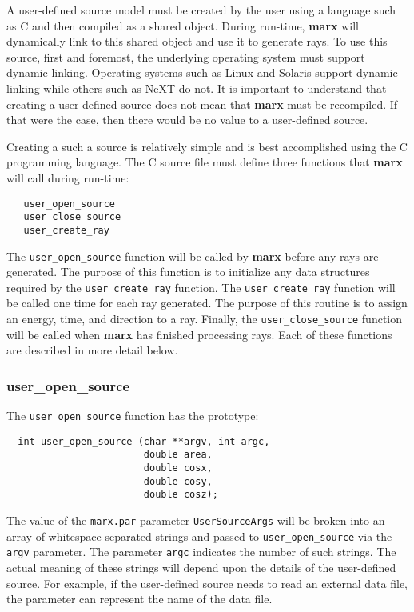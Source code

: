 \documentclass{article}
\newcommand{\marx}{{\bf marx}}
\begin{document}
 A user-defined source model must be created by the user using a
 language such as C and then compiled as a shared object.  During
 run-time, \marx{} will dynamically link to this shared object and use
 it to generate rays.  To use this source, first and foremost, the
 underlying operating system must support dynamic linking.  Operating
 systems such as Linux and Solaris support dynamic linking while
 others such as NeXT do not.  It is important to understand that
 creating a user-defined source does not mean that \marx{} must be
 recompiled.  If that were the case, then there would be no value to a
 user-defined source.

 Creating a such a source is relatively simple and is best
 accomplished using the C programming language.  The C source file must
 define three functions that \marx{} will call during run-time: 
\begin{verbatim} 
   user_open_source
   user_close_source
   user_create_ray
\end{verbatim}
 The \verb|user_open_source| function will be called by \marx{} before
 any rays are generated.  The purpose of this function is to
 initialize any data structures required by the \verb|user_create_ray|
 function.  The \verb|user_create_ray| function will be called one
 time for each ray generated.  The purpose of this routine is to
 assign an energy, time, and direction to a ray.  Finally, the
 \verb|user_close_source| function will be called when \marx{} has
 finished processing rays.  Each of these functions are described
 in more detail below.

\subsubsection{user\_open\_source}

 The \verb|user_open_source| function has the prototype:
\begin{verbatim}
  int user_open_source (char **argv, int argc,
                        double area,
                        double cosx, 
                        double cosy, 
                        double cosz);
\end{verbatim}
 The value of the \verb|marx.par| parameter \verb|UserSourceArgs| will
 be broken into an array of whitespace separated strings and passed to
 \verb|user_open_source| via the \verb|argv| parameter.  The parameter
 \verb|argc| indicates the number of such strings.  The actual meaning
 of these strings will depend upon the details of the user-defined
 source.  For example, if the user-defined source needs to read an
 external data file, the parameter can represent the name of the data
 file.
\end{document}
